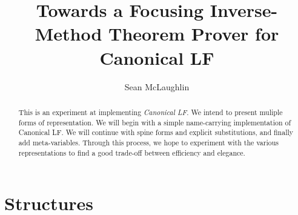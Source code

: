 \documentclass[11pt,twoside]{article}
\title{Towards a Focusing Inverse-Method Theorem Prover for Canonical LF}
\author{Sean McLaughlin}
\begin{document}
 
\maketitle

\begin{abstract} 
This is an experiment at implementing \emph{Canonical LF}.  We intend
to present muliple forms of representation.  We will begin with a
simple name-carrying implementation of Canonical LF.  We will continue
with spine forms and explicit substitutions, and finally add
meta-variables.  Through this process, we hope to experiment with the
various representations to find a good trade-off between efficiency
and elegance.
\end{abstract} 





\appendix

\section{Structures}









\end{document}
